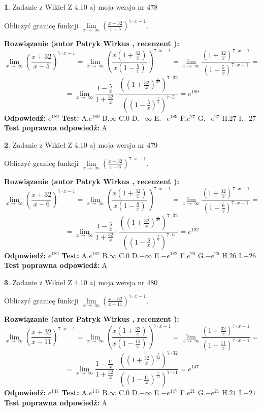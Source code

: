 \documentclass[12pt, a4paper]{article}
\theoremstyle{definition} %
\newtheorem{zad}{}
\newcommand{\zadStart}[1]{\begin{zad}#1\newline}
\newcommand{\zadStop}{\end{zad}}
\newcommand{\rozwStart}[2]{\noindent \textbf{Rozwiązanie (autor #1 , recenzent #2): }\newline}
\newcommand{\rozwStop}{\newline}
\newcommand{\odpStart}{\noindent \textbf{Odpowiedź:}\newline}
\newcommand{\odpStop}{\newline}
\newcommand{\testStart}{\noindent \textbf{Test:}\newline}
\newcommand{\testStop}{\newline}
\newcommand{\kluczStart}{\noindent \textbf{Test poprawna odpowiedź:}\newline}
\newcommand{\kluczStop}{\newline}
\begin{document}
\zadStart{Zadanie z Wikieł Z 4.10 a) moja wersja nr 478}

Obliczyć granicę funkcji  $\lim\limits_{x\to\ \infty}(\frac{x+32}{x-5})^{7\cdot x-1}$.
\zadStop
\rozwStart{Patryk Wirkus}{}
$$\lim\limits_{x\to\ \infty}(\frac{x+32}{x-5})^{7\cdot x-1} = \lim\limits_{x\to\ \infty}(\frac{x(1+\frac{32}{x})}{x(1-\frac{5}{x})})^{7\cdot x-1}=\lim\limits_{x\to\ \infty}\frac{(1+\frac{32}{x})^{7\cdot x-1}}{(1-\frac{5}{x})^{7\cdot x-1}}=$$
$$=\lim\limits_{x\to\ \infty}\frac{1-\frac{5}{x}}{1+\frac{32}{x}}\cdot\frac{((1+\frac{32}{x})^{\frac{x}{32}})^{7\cdot32}}{((1-\frac{5}{x})^{\frac{x}{5}})^{7\cdot5}}=e^{189}$$
\rozwStop
\odpStart
$e^{189}$
\odpStop
\testStart
A.$e^{189}$ B.$\infty$ C.$0$ D.$-\infty$ E.$-e^{189}$
F.$e^{27}$ G.$-e^{27}$
H.$27$
I.$-27$
\testStop
\kluczStart
A
\kluczStop



\zadStart{Zadanie z Wikieł Z 4.10 a) moja wersja nr 479}

Obliczyć granicę funkcji  $\lim\limits_{x\to\ \infty}(\frac{x+32}{x-6})^{7\cdot x-1}$.
\zadStop
\rozwStart{Patryk Wirkus}{}
$$\lim\limits_{x\to\ \infty}(\frac{x+32}{x-6})^{7\cdot x-1} = \lim\limits_{x\to\ \infty}(\frac{x(1+\frac{32}{x})}{x(1-\frac{6}{x})})^{7\cdot x-1}=\lim\limits_{x\to\ \infty}\frac{(1+\frac{32}{x})^{7\cdot x-1}}{(1-\frac{6}{x})^{7\cdot x-1}}=$$
$$=\lim\limits_{x\to\ \infty}\frac{1-\frac{6}{x}}{1+\frac{32}{x}}\cdot\frac{((1+\frac{32}{x})^{\frac{x}{32}})^{7\cdot32}}{((1-\frac{6}{x})^{\frac{x}{6}})^{7\cdot6}}=e^{182}$$
\rozwStop
\odpStart
$e^{182}$
\odpStop
\testStart
A.$e^{182}$ B.$\infty$ C.$0$ D.$-\infty$ E.$-e^{182}$
F.$e^{26}$ G.$-e^{26}$
H.$26$
I.$-26$
\testStop
\kluczStart
A
\kluczStop



\zadStart{Zadanie z Wikieł Z 4.10 a) moja wersja nr 480}

Obliczyć granicę funkcji  $\lim\limits_{x\to\ \infty}(\frac{x+32}{x-11})^{7\cdot x-1}$.
\zadStop
\rozwStart{Patryk Wirkus}{}
$$\lim\limits_{x\to\ \infty}(\frac{x+32}{x-11})^{7\cdot x-1} = \lim\limits_{x\to\ \infty}(\frac{x(1+\frac{32}{x})}{x(1-\frac{11}{x})})^{7\cdot x-1}=\lim\limits_{x\to\ \infty}\frac{(1+\frac{32}{x})^{7\cdot x-1}}{(1-\frac{11}{x})^{7\cdot x-1}}=$$
$$=\lim\limits_{x\to\ \infty}\frac{1-\frac{11}{x}}{1+\frac{32}{x}}\cdot\frac{((1+\frac{32}{x})^{\frac{x}{32}})^{7\cdot32}}{((1-\frac{11}{x})^{\frac{x}{11}})^{7\cdot11}}=e^{147}$$
\rozwStop
\odpStart
$e^{147}$
\odpStop
\testStart
A.$e^{147}$ B.$\infty$ C.$0$ D.$-\infty$ E.$-e^{147}$
F.$e^{21}$ G.$-e^{21}$
H.$21$
I.$-21$
\testStop
\kluczStart
A
\kluczStop
\end{document}
